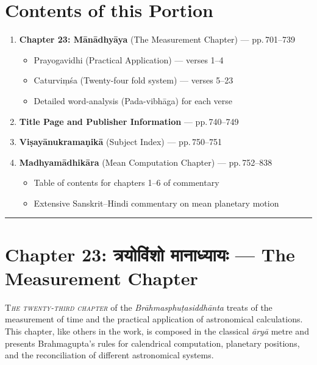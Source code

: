 \documentclass[11pt,a4paper]{article}
\newcommand{\dev}[1]{{\devanagarifont #1}}
\newcommand{\divider}{\begin{center}\rule{0.6\textwidth}{0.5pt}\end{center}}
\begin{document}
\section*{Contents of this Portion}

\begin{enumerate}[label=\arabic*.,leftmargin=*]
  \item \textbf{Chapter 23: Mānādhyāya} (The Measurement Chapter) --- pp.\,701--739
  \begin{itemize}[label=\textendash,leftmargin=1em]
    \item Prayogavidhi (Practical Application) --- verses 1--4
    \item Caturviṃśa (Twenty-four fold system) --- verses 5--23
    \item Detailed word-analysis (Pada-vibhāga) for each verse
  \end{itemize}
  \item \textbf{Title Page and Publisher Information} --- pp.\,740--749
  \item \textbf{Viṣayānukramaṇikā} (Subject Index) --- pp.\,750--751
  \item \textbf{Madhyamādhikāra} (Mean Computation Chapter) --- pp.\,752--838
  \begin{itemize}[label=\textendash,leftmargin=1em]
    \item Table of contents for chapters 1--6 of commentary
    \item Extensive Sanskrit--Hindi commentary on mean planetary motion
  \end{itemize}
\end{enumerate}

\divider
\newpage

\section*{Chapter 23: \dev{त्रयोविंशो मानाध्यायः} --- The Measurement Chapter}

\lettrine[lines=3,loversize=0.1]{T}{\textit{he twenty-third chapter}} of the \textit{Brāhmasphuṭasiddhānta} treats of the measurement of time and the practical application of astronomical calculations. This chapter, like others in the work, is composed in the classical \textit{āryā} metre and presents Brahmagupta's rules for calendrical computation, planetary positions, and the reconciliation of different astronomical systems.
\end{document}
